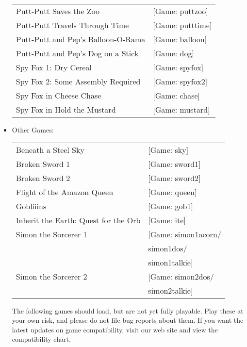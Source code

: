 \begin{itemize}
\begin{tabular}[h]{ll}
    Putt-Putt Saves the Zoo&                                       [Game: puttzoo]\\
    Putt-Putt Travels Through Time&                                [Game: putttime]\\
    Putt-Putt and Pep's Balloon-O-Rama&                            [Game: balloon]\\
    Putt-Putt and Pep's Dog on a Stick&                            [Game: dog]\\
    Spy Fox 1: Dry Cereal&                                         [Game: spyfox]\\
    Spy Fox 2: Some Assembly Required&                             [Game: spyfox2]\\
    Spy Fox in Cheese Chase&                                       [Game: chase]\\
    Spy Fox in Hold the Mustard&                                   [Game: mustard]\\
  \end{tabular}
\item Other Games:\\ 
  \begin{tabular}[h]{ll}
    Beneath a Steel Sky&                           [Game: sky]\\
    Broken Sword 1&                                [Game: sword1]\\
    Broken Sword 2&                               [Game: sword2]\\
    Flight of the Amazon Queen&                    [Game: queen]\\
    Gobliiins&                                     [Game: gob1]\\
    Inherit the Earth: Quest for the Orb&          [Game: ite]\\
     Simon the Sorcerer 1&                         [Game: simon1acorn/\\
     &                                                    simon1dos/\\
     &                                                    simon1talkie]\\
     Simon the Sorcerer 2&                         [Game: simon2dos/\\
     &                                                    simon2talkie]\\
  \end{tabular}

  The following games should load, but are not yet fully playable. Play these at your own risk, and please do not file bug reports about them. If you want
the latest updates on game compatibility, visit our web site and view the
compatibility chart.


\end{itemize}
